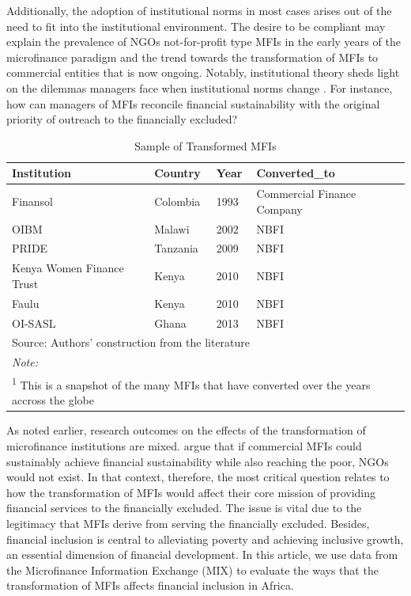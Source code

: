 \documentclass[a4paper, nobind]{templates/ociamthesis}
\begin{document}
Additionally, the adoption of institutional norms in most cases arises out of the need to fit into the institutional environment. The desire to be compliant may explain the prevalence of NGOs not-for-profit type MFIs in the early years of the microfinance paradigm and the trend towards the transformation of MFIs to commercial entities that is now ongoing. Notably, institutional theory sheds light on the dilemmas managers face when institutional norms change \autocite{thornton2015institutional}. For instance, how can managers of MFIs reconcile financial sustainability with the original priority of outreach to the financially excluded?

\begin{table}

\caption{\label{tab:unnamed-chunk-51}Sample of Transformed MFIs}
\centering
\fontsize{9}{11}\selectfont
\begin{tabular}[t]{llll}
\toprule
Institution & Country & Year & Converted\_to\\
\midrule
Finansol & Colombia & 1993 & Commercial Finance Company\\
OIBM & Malawi & 2002 & NBFI\\
PRIDE & Tanzania & 2009 & NBFI\\
Kenya Women Finance Trust & Kenya & 2010 & NBFI\\
Faulu & Kenya & 2010 & NBFI\\
\addlinespace
OI-SASL & Ghana & 2013 & NBFI\\
\bottomrule
\multicolumn{4}{l}{\rule{0pt}{1em}Source: Authors' construction from the literature}\\
\multicolumn{4}{l}{\rule{0pt}{1em}\textit{Note: }}\\
\multicolumn{4}{l}{\rule{0pt}{1em}\textsuperscript{1} This is a snapshot of the many MFIs that have converted over the years accross the globe}\\
\end{tabular}
\end{table}

As noted earlier, research outcomes on the effects of the transformation of microfinance institutions are mixed. \textcite{morduch2019challenges} argue that if commercial MFIs could sustainably achieve financial sustainability while also reaching the poor, NGOs would not exist. In that context, therefore, the most critical question relates to how the transformation of MFIs would affect their core mission of providing financial services to the financially excluded. The issue is vital due to the legitimacy that MFIs derive from serving the financially excluded. Besides, financial inclusion is central to alleviating poverty and achieving inclusive growth, an essential dimension of financial development. In this article, we use data from the Microfinance Information Exchange (MIX) to evaluate the ways that the transformation of MFIs affects financial inclusion in Africa.
\end{document}
